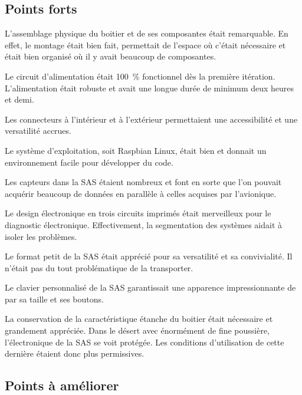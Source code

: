 \subsection{Points forts}

L’assemblage physique du boitier et de ses composantes était remarquable.
En effet, le montage était bien fait, permettait de l’espace où c’était
nécessaire et était bien organisé où il y avait beaucoup de composantes.
\par
Le circuit d’alimentation était 100~\% fonctionnel dès la première itération.
L’alimentation était robuste et avait une longue durée de minimum deux heures
et demi.
\par
Les connecteurs à l’intérieur et à l’extérieur permettaient une accessibilité
et une versatilité accrues.
\par
Le système d’exploitation, soit Raspbian Linux, était bien et donnait un
environnement facile pour développer du code.
\par
Les capteurs dans la SAS étaient nombreux et font en sorte que l’on pouvait
acquérir beaucoup de données en parallèle à celles acquises par l’avionique.
\par
Le design électronique en trois circuits imprimés était merveilleux pour le
diagnostic électronique. Effectivement, la segmentation des systèmes aidait à
isoler les problèmes.
\par
Le format petit de la SAS était apprécié pour sa versatilité et sa
convivialité. Il n’était pas du tout problématique de la transporter.
\par
Le clavier personnalisé de la SAS garantissait une apparence impressionnante de
par sa taille et ses boutons.
\par
La conservation de la caractéristique étanche du boitier était nécessaire et
grandement appréciée. Dans le désert avec énormément de fine poussière,
l’électronique de la SAS se voit protégée. Les conditions d’utilisation de
cette dernière étaient donc plus permissives.

\subsection{Points à améliorer}

